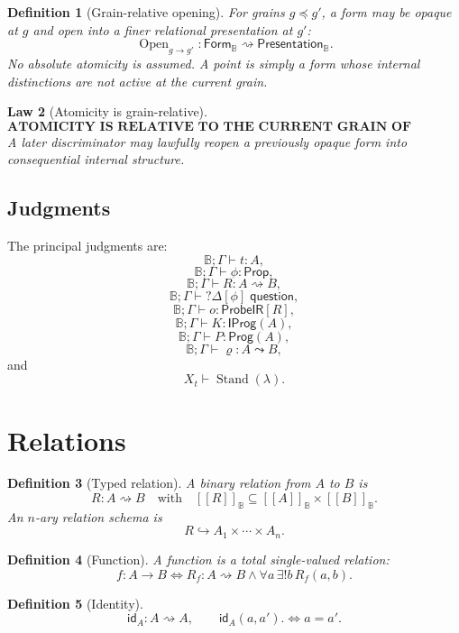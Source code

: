 \documentclass[11pt,oneside]{article}
\newtheorem{definition}{Definition}[section]
\newtheorem{law}[definition]{Law}
\newcommand{\B}{\mathbb B}
\newcommand{\Prop}{\mathsf{Prop}}
\newcommand{\Prog}{\mathsf{Prog}}
\newcommand{\ProbeIR}{\mathsf{ProbeIR}}
\newcommand{\Stand}{\operatorname{Stand}}
\newcommand{\ResPath}{\varrho}
\newcommand{\den}[1]{[\![#1]\!]}
\begin{document}
\begin{definition}[Grain-relative opening]
For grains \(g\preceq g'\), a form may be opaque at \(g\) and open into a finer relational presentation at \(g'\):
\[
\boxed{
\operatorname{Open}_{g\to g'}:
\mathsf{Form}_{\B}
\rightsquigarrow
\mathsf{Presentation}_{\B}.
}
\]
No absolute atomicity is assumed.  A point is simply a form whose internal distinctions are not active at the current grain.
\end{definition}

\begin{law}[Atomicity is grain-relative]
\[
\boxed{\textbf{ATOMICITY IS RELATIVE TO THE CURRENT GRAIN OF INQUIRY.}}
\]
A later discriminator may lawfully reopen a previously opaque form into consequential internal structure.
\end{law}

\subsection{Judgments}

The principal judgments are:
\[
\B;\Gamma\vdash t:A,
\]
\[
\B;\Gamma\vdash\phi:\Prop,
\]
\[
\B;\Gamma\vdash R:A\rightsquigarrow B,
\]
\[
\B;\Gamma\vdash ?\Delta[\phi]\;\mathsf{question},
\]
\[
\B;\Gamma\vdash o:\ProbeIR[R],
\]
\[
\B;\Gamma\vdash K:\mathsf{IProg}(A),
\]
\[
\B;\Gamma\vdash P:\Prog(A),
\]
\[
\B;\Gamma\vdash \ResPath:A\leadsto B,
\]
and
\[
X_t\vdash \Stand(\lambda).
\]

\section{Relations}

\begin{definition}[Typed relation]
A binary relation from \(A\) to \(B\) is
\[
R:A\rightsquigarrow B
\quad\text{with}\quad
\den{R}_{\B}\subseteq \den A_{\B}\times\den B_{\B}.
\]
An \(n\)-ary relation schema is
\[
R\hookrightarrow A_1\times\cdots\times A_n.
\]
\end{definition}

\begin{definition}[Function]
A function is a total single-valued relation:
\[
f:A\to B
\iff
R_f:A\rightsquigarrow B
\land
\forall a\,\exists!b\,R_f(a,b).
\]
\end{definition}

\begin{definition}[Identity]
\[
\mathsf{id}_A:A\rightsquigarrow A,
\qquad
\mathsf{id}_A(a,a').
\iff a=a'.
\]
\end{definition}
\end{document}

